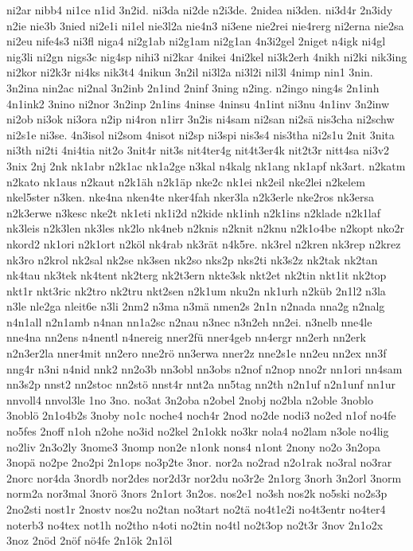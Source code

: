 {ni2ar
nibb4
ni1ce
n1id
3n2id.
ni3da
ni2de
n2i3de.
2nidea
ni3den.
ni3d4r
2n3idy
n2ie
nie3b
3nied
ni2e1i
ni1el
nie3l2a
nie4n3
ni3ene
nie2rei
nie4rerg
ni2erna
nie2sa
ni2eu
nife4s3
ni3fl
niga4
ni2g1ab
ni2g1am
ni2g1an
4n3i2gel
2niget
n4igk
ni4gl
nig3li
ni2gn
nigs3c
nig4sp
nihi3
ni2kar
4nikei
4ni2kel
ni3k2erh
4nikh
ni2ki
nik3ing
ni2kor
ni2k3r
ni4ks
nik3t4
4nikun
3n2il
ni3l2a
ni3l2i
nil3l
4nimp
nin1
3nin.
3n2ina
nin2ac
ni2nal
3n2inb
2n1ind
2ninf
3ning
n2ing.
n2ingo
ning4s
2n1inh
4n1ink2
3nino
ni2nor
3n2inp
2n1ins
4ninse
4ninsu
4n1int
ni3nu
4n1inv
3n2inw
ni2ob
ni3ok
ni3ora
n2ip
ni4ron
n1irr
3n2is
ni4sam
ni2san
ni2sä
nis3cha
ni2schw
ni2s1e
ni3se.
4n3isol
ni2som
4nisot
ni2sp
ni3spi
nis3s4
nis3tha
ni2s1u
2nit
3nita
ni3th
ni2ti
4ni4tia
nit2o
3nit4r
nit3s
nit4ter4g
nit4t3er4k
nit2t3r
nitt4sa
ni3v2
3nix
2nj
2nk
nk1abr
n2k1ac
nk1a2ge
n3kal
n4kalg
nk1ang
nk1apf
nk3art.
n2katm
n2kato
nk1aus
n2kaut
n2k1äh
n2k1äp
nke2c
nk1ei
nk2eil
nke2lei
n2kelem
nkel5ster
n3ken.
nke4na
nken4te
nker4fah
nker3la
n2k3erle
nke2ros
nk3ersa
n2k3erwe
n3kesc
nke2t
nk1eti
nk1i2d
n2kide
nk1inh
n2k1ins
n2klade
n2k1laf
nk3leis
n2k3len
nk3les
nk2lo
nk4neb
n2knis
n2knit
n2knu
n2k1o4be
n2kopt
nko2r
nkord2
nk1ori
n2k1ort
n2köl
nk4rab
nk3rät
n4k5re.
nk3rel
n2kren
nk3rep
n2krez
nk3ro
n2krol
nk2sal
nk2se
nk3sen
nk2so
nks2p
nks2ti
nk3s2z
nk2tak
nk2tan
nk4tau
nk3tek
nk4tent
nk2terg
nk2t3ern
nkte3sk
nkt2et
nk2tin
nkt1it
nk2top
nkt1r
nkt3ric
nk2tro
nk2tru
nkt2sen
n2k1um
nku2n
nk1urh
n2küb
2n1l2
n3la
n3le
nle2ga
nleit6e
n3li
2nm2
n3ma
n3mä
nmen2s
2n1n
n2nada
nna2g
n2nalg
n4n1all
n2n1amb
n4nan
nn1a2sc
n2nau
n3nec
n3n2eh
nn2ei.
n3nelb
nne4le
nne4na
nn2ens
n4nentl
n4nereig
nner2fü
nner4geb
nn4ergr
nn2erh
nn2erk
n2n3er2la
nner4mit
nn2ero
nne2rö
nn3erwa
nner2z
nne2s1e
nn2eu
nn2ex
nn3f
nng4r
n3ni
n4nid
nnk2
nn2o3b
nn3obl
nn3obs
n2nof
n2nop
nno2r
nn1ori
nn4sam
nn3s2p
nnst2
nn2stoc
nn2stö
nnst4r
nnt2a
nn5tag
nn2th
n2n1uf
n2n1unf
nn1ur
nnvoll4
nnvol3le
1no
3no.
no3at
3n2oba
n2obel
2nobj
no2bla
n2oble
3noblo
3noblö
2n1o4b2s
3noby
no1c
noche4
noch4r
2nod
no2de
nodi3
no2ed
n1of
no4fe
no5fes
2noff
n1oh
n2ohe
no3id
no2kel
2n1okk
no3kr
nola4
no2lam
n3ole
no4lig
no2liv
2n3o2ly
3nome3
3nomp
non2e
n1onk
nons4
n1ont
2nony
no2o
3n2opa
3nopä
no2pe
2no2pi
2n1ops
no3p2te
3nor.
nor2a
no2rad
n2o1rak
no3ral
no3rar
2norc
nor4da
3nordb
nor2des
nor2d3r
nor2du
no3r2e
2n1org
3norh
3n2orl
3norm
norm2a
nor3mal
3norö
3nors
2n1ort
3n2os.
nos2e1
no3sh
nos2k
no5ski
no2s3p
2no2sti
nost1r
2nostv
nos2u
no2tan
no3tart
no2tä
no4t1e2i
no4t3entr
no4ter4
noterb3
no4tex
not1h
no2tho
n4oti
no2tin
no4tl
no2t3op
no2t3r
3nov
2n1o2x
3noz
2nöd
2nöf
nö4fe
2n1ök
2n1öl
}
